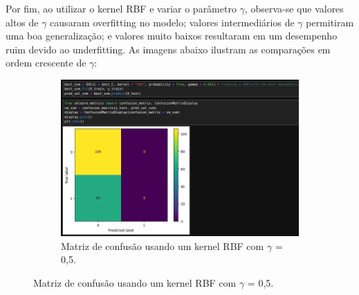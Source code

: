 \documentclass{article} %
\begin{document}
   \newpage

   Por fim, ao utilizar o kernel RBF e variar o parâmetro \(\gamma\), observa-se que valores altos de \(\gamma\) causaram overfitting no modelo; valores intermediários de \(\gamma\) permitiram uma boa generalização; e valores muito baixos resultaram em um desempenho ruim devido ao underfitting. As imagens abaixo ilustram as comparações em ordem crescente de \(\gamma\): 

   \begin{figure}[H] %
      \centering %
      
      \begin{subfigure}{0.75\textwidth} %
         \centering %
         \includegraphics[width=\linewidth]{gamma0_5.png} %
         \caption{Matriz de confusão usando um kernel RBF com \(\gamma\) = 0,5.} %
         \label{fig:exemplo1} %
   \end{subfigure}
      \hfill %
      

\end{figure}
\end{document}
